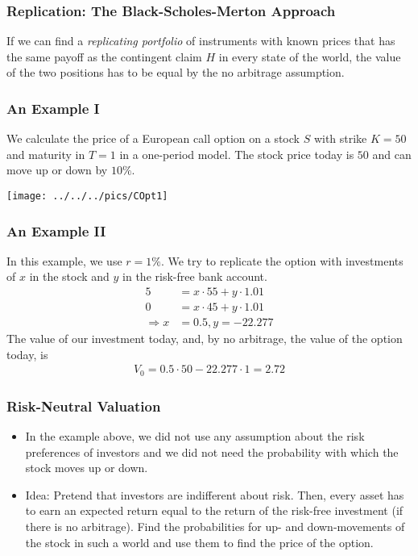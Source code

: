 \begin{frame}[fragile]
\frametitle{Replication: The Black-Scholes-Merton Approach}
If we can find a \emph{replicating portfolio} of instruments with known prices
that has the same payoff as the contingent claim $H$ in every state of the world, the value of the
two positions has to be equal by the no arbitrage assumption.
\end{frame}

\begin{frame}[fragile]
\frametitle{An Example I}
We calculate the price of a European call option on a stock $S$ with strike
$K=50$ and maturity in $T=1$ in a one-period model. The stock price today is
$50$ and can move up or down by $10\%$.

\center
\texttt{[image: ../../../pics/COpt1]}
\end{frame}

\begin{frame}[fragile]
\frametitle{An Example II}
In this example, we use $r=1\%$. We try to replicate the option with
investments of $x$ in the stock and $y$ in the risk-free bank account.
\begin{align*}
  5 &= x \cdot 55 + y \cdot 1.01 \\
  0 &= x \cdot 45 + y \cdot 1.01 \\
  \Rightarrow  x &= 0.5, y= -22.277
\end{align*}
The value of our investment today, and, by no arbitrage, the value of the option
today, is
\begin{align*}
  V_0 = 0.5 \cdot 50 -22.277 \cdot 1 = 2.72
\end{align*}
\end{frame}

\begin{frame}[fragile]
\frametitle{Risk-Neutral Valuation}
\begin{itemize}
  \item In the example above, we did not use any assumption about the risk
  preferences of investors and we did not need the probability with which the
  stock moves up or down.
  \item Idea: Pretend that investors are indifferent about risk. Then, every
  asset has to earn an expected return equal to the return of the risk-free
  investment (if there is no arbitrage). Find the probabilities for up- and
  down-movements of the stock in such a world and use them to find the price of
  the option.
\end{itemize}
\end{frame}

